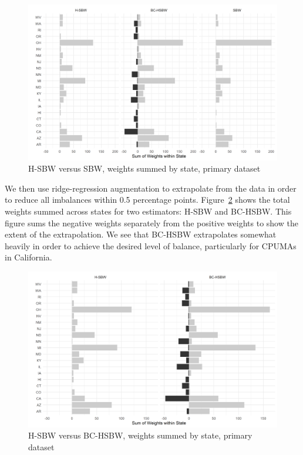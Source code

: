 \begin{figure}[H]
\begin{center}
    \caption{H-SBW versus SBW, weights summed by state, primary dataset}
    \label{fig:sbwvhsbw1}
    \includegraphics[scale=0.6]{01_Plots/weights-by-state-sbw-hsbw-c1.png}
\end{center}
\end{figure}

We then use ridge-regression augmentation to extrapolate from the data in order to reduce all imbalances within 0.5 percentage points. Figure~\ref{fig:statewghts} shows the total weights summed across states for two estimators: H-SBW and BC-HSBW. This figure sums the negative weights separately from the positive weights to show the extent of the extrapolation. We see that BC-HSBW extrapolates somewhat heavily in order to achieve the desired level of balance, particularly for CPUMAs in California. 

\begin{figure}[H]
\begin{center}
    \caption{H-SBW versus BC-HSBW, weights summed by state, primary dataset}
    \label{fig:statewghts}
    \includegraphics[scale=0.6]{01_Plots/weights-by-state-hsbw-c1.png}
\end{center}
\end{figure}

